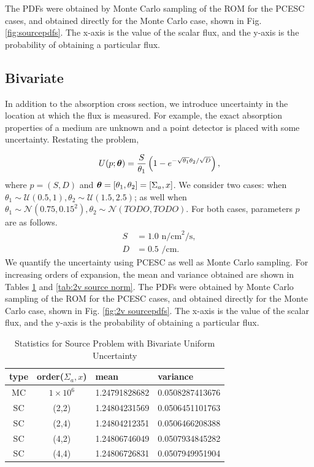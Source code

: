 The PDFs were obtained by Monte Carlo sampling of the ROM for the PCESC cases, and obtained directly for the Monte Carlo case, shown in Fig. \ref{fig:sourcepdfs}.  The x-axis is the value of the scalar flux, and the y-axis is the probability of obtaining a particular flux.

\subsection{Bivariate}
In addition to the absorption cross section, we introduce uncertainty in the location at which the flux is measured.  For example, the exact absorption properties of a medium are unknown and a point detector is placed with some uncertainty.  Restating the problem,

\begin{equation}
U(p;\vb*{\theta}) = \frac{S}{\theta_1}\left(1-e^{-\sqrt{\theta_1} \theta_2/\sqrt{D}}\right),
\end{equation}
where $p=(S,D)$ and $\vb*{\theta}=[\theta_1,\theta_2]=[\Sigma_a,x]$.  
We consider two cases: when $\theta_1\sim\mathcal{U}(0.5,1),\theta_2\sim\mathcal{U}(1.5,2.5)$; as well when $\theta_1\sim\mathcal{N}(0.75,0.15^2),\theta_2\sim\mathcal{N}(TODO,TODO)$.   For both cases, parameters $p$ are as follows.
\begin{align}
S &= 1.0 \text{ n/cm}^2\text{/s},\\
D &= 0.5 \text{ /cm}.
\end{align}
We quantify the uncertainty using PCESC as well as Monte Carlo sampling.
For increasing orders of expansion, the mean and variance obtained are shown in Tables \ref{tab:2v source uni} and \ref{tab:2v source norm}.  The PDFs were obtained by Monte Carlo sampling of the ROM for the PCESC cases, and obtained directly for the Monte Carlo case, shown in Fig. \ref{fig:2v sourcepdfs}.  The x-axis is the value of the scalar flux, and the y-axis is the probability of obtaining a particular flux.
\begin{table}
\begin{center}
\begin{tabular}{c c|l l}
type & order($\Sigma_a,x$) & mean & variance \\ \hline
MC & $1\times10^6$ & 1.24791828682 & 0.0508287413676\\
SC & (2,2) & 1.24804231569 & 0.0506451101763 \\
SC & (2,4) & 1.24804212351 & 0.0506466208388\\
SC & (4,2) & 1.24806746049 & 0.0507934845282\\
SC & (4,4) & 1.24806726831 & 0.0507949951904 \\
\end{tabular}
\end{center}
\caption{Statistics for Source Problem with Bivariate Uniform Uncertainty}
\label{tab:2v source uni}
\end{table}

